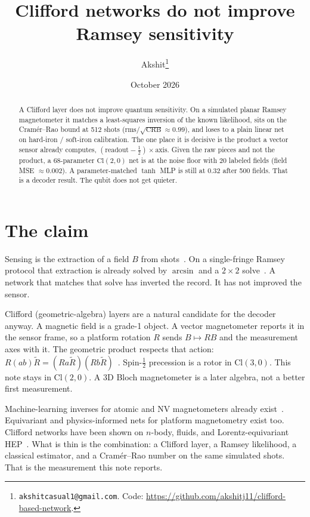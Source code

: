 \documentclass[11pt]{article}
\title{Clifford networks do not improve Ramsey sensitivity}
\author{Akshit\thanks{\texttt{akshitcasual1@gmail.com}.
Code: \url{https://github.com/akshitj11/clifford-based-network}.}}
\date{October 2026}
\begin{document}
\maketitle

\begin{abstract}
A Clifford layer does not improve quantum sensitivity.
On a simulated planar Ramsey magnetometer it matches a least-squares inversion of the known likelihood, sits on the Cram\'er--Rao bound at 512 shots ($\mathrm{rms}/\sqrt{\mathrm{CRB}}\approx 0.99$), and loses to a plain linear net on hard-iron / soft-iron calibration.
The one place it is decisive is the product a vector sensor already computes, $(\mathrm{readout}-\tfrac12)\times\mathrm{axis}$.
Given the raw pieces and not the product, a 68-parameter $\mathrm{Cl}(2,0)$ net is at the noise floor with 20 labeled fields (field MSE $\approx 0.002$).
A parameter-matched $\tanh$ MLP is still at $0.32$ after 500 fields.
That is a decoder result.
The qubit does not get quieter.
\end{abstract}

\section{The claim}

Sensing is the extraction of a field $B$ from shots~\citep{degen2017,helstrom1969}.
On a single-fringe Ramsey protocol that extraction is already solved by $\arcsin$ and a $2\times 2$ solve~\citep{ramsey1950,taylor2008}.
A network that matches that solve has inverted the record.
It has not improved the sensor.

Clifford (geometric-algebra) layers are a natural candidate for the decoder anyway.
A magnetic field is a grade-1 object.
A vector magnetometer reports it in the sensor frame, so a platform rotation $R$ sends $B\mapsto RB$ and the measurement axes with it.
The geometric product respects that action: $R(ab)\tilde R=(Ra\tilde R)(Rb\tilde R)$~\citep{doran2003,ruhe2023cgenn}.
Spin-$\tfrac12$ precession is a rotor in $\mathrm{Cl}(3,0)$.
This note stays in $\mathrm{Cl}(2,0)$.
A 3D Bloch magnetometer is a later algebra, not a better first measurement.

Machine-learning inverses for atomic and NV magnetometers already exist~\citep{liu2023,zhang2024}.
Equivariant and physics-informed nets for platform magnetometry exist too.
Clifford networks have been shown on $n$-body, fluids, and Lorentz-equivariant HEP~\citep{ruhe2023gcan,ruhe2023cgenn,brandstetter2023}.
What is thin is the combination: a Clifford layer, a Ramsey likelihood, a classical estimator, and a Cram\'er--Rao number on the same simulated shots.
That is the measurement this note reports.
\end{document}
